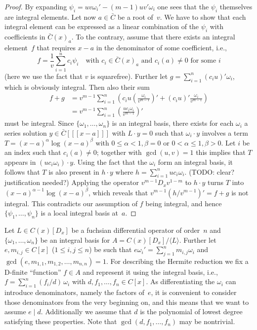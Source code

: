 \documentclass{sig-alternate}
\def\<#1>{\langle#1\rangle}
\newcommand{\red}{\color{red}}
\begin{document}
\begin{proof}
By expanding $\psi_i=uv\omega_i'-(m-1)uv'\omega_i$ one sees that the $\psi_i$
themselves are integral elements. Let now $a\in\bar{C}$ be a root of~$v$. We
have to show that each integral element can be expressed as a linear
combination of the $\psi_i$ with coefficients in $\bar{C}(x)_a$. To the contrary,
assume that there exists an integral element~$f$ that requires $x-a$ in the
denominator of some coefficient, i.e.,
\[
  f = \frac{1}{v} \sum_{i=1}^n c_i \psi_i \quad\text{with }c_i\in \bar{C}(x)_a
  \text{ and } c_i(a)\neq0 \text{ for some } i
\]
(here we use the fact that $v$ is squarefree).  Further let $g=\sum_{i=1}^n
(c_iu)'\omega_i$, which is obviously integral. Then also their sum
\begin{align*}
  f+g &= v^{m-1} \sum_{i=1}^n \left(c_iu \left(\frac{\omega_i}{v^{m-1}}\right)'
  + (c_iu)'\frac{\omega_i}{v^{m-1}} \right) \\
  &= v^{m-1} \sum_{i=1}^n \left(\frac{uc_i\omega_i}{v^{m-1}}\right)'
\end{align*}
must be integral. Since $\{\omega_1,\ldots,\omega_n\}$ is an integral basis,
there exists for each $\omega_i$ a series solution $y\in\bar{C}[[[x-a]]]$ with
$L\cdot y=0$ such that $\omega_i\cdot y$ involves a term
$T=(x-a)^\alpha\log(x-a)^\beta$ with $0\leq\alpha<1,\beta=0$ or
$0<\alpha\leq1,\beta>0$. Let $i$ be an index such that $c_i(a)\neq0$; together
with $\gcd(u,v)=1$ this implies that $T$ appears in $(uc_i\omega_i)\cdot
y$. Using the fact that the $\omega_i$ form an integral basis, it follows that
$T$ is also present in $h\cdot y$ where $h=\sum_{i=1}^n uc_i\omega_i$. {\red
  (TODO: clear?  justification needed?)}  Applying the operator
$v^{m-1}D_xv^{1-m}$ to $h\cdot y$ turns $T$ into
$(x-a)^{\alpha-1}\log(x-a)^\beta$, which reveals that
$v^{m-1}(h/v^{m-1})'=f+g$ is not integral. This contradicts our assumption of
$f$ being integral, and hence $\{\psi_1,\ldots,\psi_n\}$ is a local integral
basis at~$a$.
\end{proof}

Let $L\in C(x)[D_x]$ be a fuchsian differential operator of order~$n$ and
$\{\omega_1,\ldots,\omega_n\}$ be an integral basis for $A=C(x)[D_x]/\<L>$.
Further let $e,m_{i,j}\in C[x]$ ($1\leq i,j\leq n$) be such that
$e\omega_i'=\sum_{j=1}^n m_{i,j}\omega_i$ and
$\gcd(e,m_{1,1},m_{1,2},\ldots,m_{n,n})=1$. For describing the Hermite
reduction we fix a D-finite ``function'' $f\in A$ and represent it using the
integral basis, i.e., $f=\sum_{i=1}^n (f_i/d)\,\omega_i$ with
$d,f_1,\ldots,f_n\in C[x]$. As differentiating the $\omega_i$ can introduce
denominators, namely the factors of~$e$, it is convenient to consider those
denominators from the very beginning on, and this means that we want to assume
$e\mid d$. Additionally we assume that $d$ is the polynomial of lowest degree
satisfying these properties. %
Note that $\gcd(d,f_1,\ldots,f_n)$ may be nontrivial.
\end{document}
